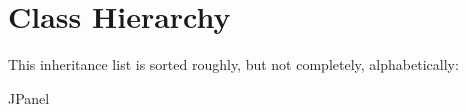 \section{Class Hierarchy}
This inheritance list is sorted roughly, but not completely, alphabetically\+:\begin{DoxyCompactList}
\item J\+Panel\begin{DoxyCompactList}
\item {}
\end{DoxyCompactList}
\end{DoxyCompactList}
